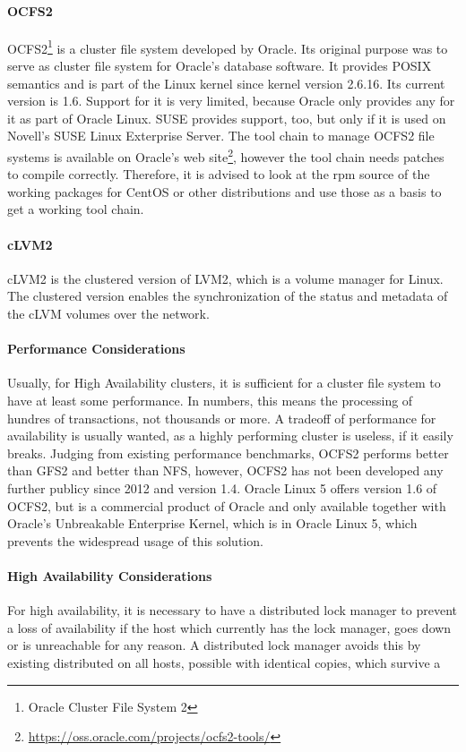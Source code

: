 \paragraph{OCFS2}
OCFS2\footnote{Oracle Cluster File System 2} is a cluster file system developed by Oracle.
Its original purpose was to serve as cluster file system for Oracle's database software.
It provides POSIX semantics and is part of the Linux kernel since kernel version 2.6.16. 
\linebreak[3]
Its current version is 1.6. Support for it is very limited, because Oracle only
provides any for it as part of Oracle Linux. SUSE provides support, too, but only
if it is used on Novell's SUSE Linux Exterprise Server. The tool chain to manage
OCFS2 file systems is available on Oracle's web site\footnote{\url{https://oss.oracle.com/projects/ocfs2-tools/}},
however the tool chain needs patches to compile correctly. Therefore, it is advised
to look at the rpm source of the working packages for CentOS or other distributions and use those as a basis
to get a working tool chain.
\paragraph{cLVM2}
cLVM2 is the clustered version of LVM2, which is a volume manager for Linux.
The clustered version enables the synchronization of the status and metadata
of the cLVM volumes over the network.

\paragraph{Performance Considerations}
Usually, for High Availability clusters, it is sufficient for a cluster file system
to have at least some performance. In numbers, this means the processing of 
hundres of transactions, not thousands or more. A tradeoff of performance for
availability is usually wanted, as a highly performing cluster is useless, if
it easily breaks. Judging from existing performance benchmarks,
\ac{OCFS2} performs better than \ac{GFS2} and better than \ac{NFS}, however,
\ac{OCFS2} has not been developed any further publicy since 2012 and version 1.4.
Oracle Linux 5 offers version 1.6 of \ac{OCFS2}, but is a commercial product
of Oracle and only available together with Oracle's Unbreakable Enterprise
Kernel, which is in Oracle Linux 5, which prevents the widespread usage of this solution.

\paragraph{High Availability Considerations}
For high availability, it is necessary to have a distributed lock manager to prevent
a loss of availability if the host which currently has the lock manager, goes down or
is unreachable for any reason. A distributed lock manager avoids this by existing
distributed on all hosts, possible with identical copies, which survive a 

